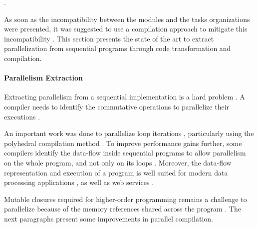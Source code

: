 .

As soon as the incompatibility between the modules and the tasks organizations were presented, it was suggested to use a compilation approach to mitigate this incompatibility \cite{Parnas1972}.
This section presents the state of the art to extract parallelization from sequential programs through code transformation and compilation.


\paragraph{Parallelism Extraction}

Extracting parallelism from a sequential implementation is a hard problem \cite{Johnston2004a}.
A compiler needs to identify the commutative operations to parallelize their executions \cite{Rinard1996,Clements2013a}.

An important work was done to parallelize loop iterations \cite{Mauras1989,Amarasinghe1995,Chen2008,Banerjee2013,Radoi2014}, particularly using the polyhedral compilation method \cite{Yuki2013,Grosser2011,Trifunovic2010,Bastoul2004}.
To improve performance gains further, some compilers identify the data-flow inside sequential programs to allow parallelism on the whole program, and not only on its loops \cite{Beck1991,Catanzaro2009,Li2012}.
Moreover, the data-flow representation and execution of a program is well suited for modern data processing applications \cite{Fernandez2014a}, as well as web services \cite{Salmito2013}.

Mutable closures required for higher-order programming remains a challenge to parallelize because of the memory references shared across the program \cite{Harrison1989, Nicolay2010, Matsakis2012a}.
The next paragraphs present some improvements in parallel compilation.


